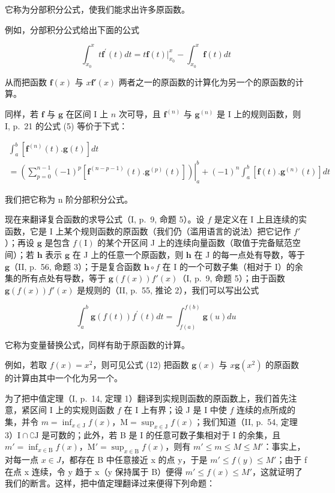 它称为分部积分公式，使我们能求出许多原函数。

例如，分部积分公式给出下面的公式

\[
\int_ {x _ {0}} ^ {x} t \mathbf {f} ^ {\prime} (t) d t = t \mathbf {f} (t) \Big | _ {x _ {0}} ^ {x} - \int_ {x _ {0}} ^ {x} \mathbf {f} (t) d t
\]

从而把函数 \(\mathbf{f}(x)\) 与 \(x\mathbf{f}'(x)\) 两者之一的原函数的计算化为另一个的原函数的计算。

同样，若 \(\mathbf{f}\) 与 \(\mathbf{g}\) 在区间 I 上 \(n\) 次可导，且 \(\mathbf{f}^{(n)}\) 与 \(\mathbf{g}^{(n)}\) 是 I 上的规则函数，则 I, p.~21 的公式 (5) 等价于下式：

\[
\begin{array}{l} \int_ {a} ^ {b} [ \mathbf {f} ^ {(n)} (t). \mathbf {g} (t) ] d t \\ = \left. \left(\sum_ {p = 0} ^ {n - 1} (- 1) ^ {p} [ \mathbf {f} ^ {(n - p - 1)} (t). \mathbf {g} ^ {(p)} (t) ]\right) \right| _ {a} ^ {b} + (- 1) ^ {n} \int_ {a} ^ {b} [ \mathbf {f} (t). \mathbf {g} ^ {(n)} (t) ] d t \end{array}\tag{11}
\]

我们把它称为 n 阶分部积分公式。

现在来翻译复合函数的求导公式（I, p.~9, 命题 5）。设 \(f\) 是定义在 I 上且连续的实函数，它是 I 上某个规则函数的原函数（我们仍（滥用语言的说法）把它记作 \(f'\)）；再设 \(\mathbf{g}\) 是包含 \(f(\mathrm{I})\) 的某个开区间 J 上的连续向量函数（取值于完备赋范空间）；若 \(\mathbf{h}\) 表示 \(\mathbf{g}\) 在 J 上的任意一个原函数，则 \(\mathbf{h}\) 在 J 的每一点处有导数，等于 \(\mathbf{g}\)（II, p.~56, 命题 3）；于是复合函数 \(\mathbf{h} \circ f\) 在 I 的一个可数子集（相对于 I）的余集的所有点处有导数，等于 \(\mathbf{g}(f(x))f'(x)\)（I, p.~9, 命题 5）；由于函数 \(\mathbf{g}(f(x))f'(x)\) 是规则的（II, p.~55, 推论 2），我们可以写出公式

\[
\int_ {a} ^ {b} \mathbf {g} (f (t)) f ^ {\prime} (t) d t = \int_ {f (a)} ^ {f (b)} \mathbf {g} (u) d u\tag{12}
\]

它称为变量替换公式，同样有助于原函数的计算。

例如，若取 \(f(x) = x^{2}\)，则可见公式 (12) 把函数 \(\mathbf{g}(x)\) 与 \(x\mathbf{g}(x^{2})\) 的原函数的计算由其中一个化为另一个。

为了把中值定理（I, p.~14, 定理 1）翻译到实规则函数的原函数上，我们首先注意，紧区间 I 上的实规则函数 \(f\) 在 I 上有界；设 J 是 I 中使 \(f\) 连续的点所成的集，并令 \(m = \inf_{x \in \mathrm{J}} f(x)\)，\(\mathrm{M} = \sup_{x \in \mathrm{J}} f(x)\)；我们知道（II, p.~54, 定理 3）\(\mathrm{I} \cap \complement \mathrm{J}\) 是可数的；此外，若 B 是 I 的任意可数子集相对于 I 的余集，且 \(m' = \inf_{x \in \mathrm{B}} f(x)\)，\(\mathrm{M}' = \sup_{x \in \mathrm{B}} f(x)\)，则有 \(m' \leqslant m \leqslant M \leqslant M'\)：事实上，对每一点 \(x \in J\)，都存在 B 中任意接近 x 的点 y，于是 \(m' \leqslant f(y) \leqslant M'\)；由于 f 在点 x 连续，令 y 趋于 x（y 保持属于 B）便得 \(m' \leqslant f(x) \leqslant M'\)，这就证明了我们的断言。这样，把中值定理翻译过来便得下列命题：

